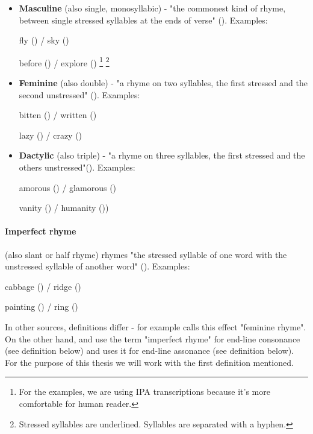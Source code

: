 \begin{itemize}
	\item \textbf{Masculine} (also single, monosyllabic) - "the commonest kind of rhyme, between single stressed syllables at the ends of verse" (\cite{oxforddict2008literary}). 
	Examples: 
	
	fly () / sky ()

	before () / explore ()
	\footnote{For the examples, we are using IPA transcriptions because it's more comfortable for human reader.}
	\footnote{Stressed syllables are underlined. Syllables are separated with a hyphen.}
	
	\item \textbf{Feminine} (also double) - "a rhyme on two syllables, the first stressed and the second unstressed" (\cite{oxforddict2008literary}). Examples: 
	
	bitten () / written ()
	
	lazy () / crazy ()
	
	\item \textbf{Dactylic} (also triple) - "a rhyme on three syllables, the first stressed and the others unstressed"(\cite{oxforddict2008literary}). Examples: 
	
	amorous () / glamorous ()
	
	vanity () / humanity ())
	
\end{itemize}

\paragraph{Imperfect rhyme} (also slant or half rhyme)  rhymes "the stressed syllable of one word with the unstressed syllable of another word" (\cite{bergman2017litcharts}). Examples: 

cabbage () / ridge ()

painting () / ring ()

\noindent In other sources, definitions differ - for example \cite{literarydevices2020} calls this effect "feminine rhyme".  On the other hand, \cite{oxforddict2008literary} and \cite{britannica} use the term "imperfect rhyme" for end-line consonance (see definition below) and \cite{vanphonological} uses it for end-line assonance (see definition below). For the purpose of this thesis we will work with the first definition mentioned.

